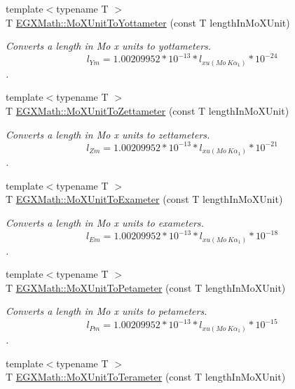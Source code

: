 \begin{DoxyCompactItemize}
{\footnotesize template$<$typename T $>$ }\\T \mbox{\hyperlink{group___e_g_x_math-_conversions-_length_conversions-_non-_s_i-_mo_x_unit-_s_i_ga4924e06e3105b90d3d383bce75466c65}{E\+G\+X\+Math\+::\+Mo\+X\+Unit\+To\+Yottameter}} (const T length\+In\+Mo\+X\+Unit)
\begin{DoxyCompactList}\small\item\em Converts a length in Mo x units to yottameters. \[ l_{Ym}=1.00209952*10^{-13} * l_{xu(Mo\ K\alpha_1)} * 10^{-24} \]. \end{DoxyCompactList}\item 
{\footnotesize template$<$typename T $>$ }\\T \mbox{\hyperlink{group___e_g_x_math-_conversions-_length_conversions-_non-_s_i-_mo_x_unit-_s_i_ga42140ef81550c27028b758c9f15200e3}{E\+G\+X\+Math\+::\+Mo\+X\+Unit\+To\+Zettameter}} (const T length\+In\+Mo\+X\+Unit)
\begin{DoxyCompactList}\small\item\em Converts a length in Mo x units to zettameters. \[ l_{Zm}=1.00209952*10^{-13} * l_{xu(Mo\ K\alpha_1)} * 10^{-21} \]. \end{DoxyCompactList}\item 
{\footnotesize template$<$typename T $>$ }\\T \mbox{\hyperlink{group___e_g_x_math-_conversions-_length_conversions-_non-_s_i-_mo_x_unit-_s_i_ga063e533efef257dd481853b57712f0c6}{E\+G\+X\+Math\+::\+Mo\+X\+Unit\+To\+Exameter}} (const T length\+In\+Mo\+X\+Unit)
\begin{DoxyCompactList}\small\item\em Converts a length in Mo x units to exameters. \[ l_{Em}=1.00209952*10^{-13} * l_{xu(Mo\ K\alpha_1)} * 10^{-18} \]. \end{DoxyCompactList}\item 
{\footnotesize template$<$typename T $>$ }\\T \mbox{\hyperlink{group___e_g_x_math-_conversions-_length_conversions-_non-_s_i-_mo_x_unit-_s_i_gadaa6c90eb9cf739e3bfd9fd66d6a998a}{E\+G\+X\+Math\+::\+Mo\+X\+Unit\+To\+Petameter}} (const T length\+In\+Mo\+X\+Unit)
\begin{DoxyCompactList}\small\item\em Converts a length in Mo x units to petameters. \[ l_{Pm}=1.00209952*10^{-13} * l_{xu(Mo\ K\alpha_1)} * 10^{-15} \]. \end{DoxyCompactList}\item 
{\footnotesize template$<$typename T $>$ }\\T \mbox{\hyperlink{group___e_g_x_math-_conversions-_length_conversions-_non-_s_i-_mo_x_unit-_s_i_ga8f6e4c8426fae89833534d8aac0b69c7}{E\+G\+X\+Math\+::\+Mo\+X\+Unit\+To\+Terameter}} (const T length\+In\+Mo\+X\+Unit)

\end{DoxyCompactItemize}
